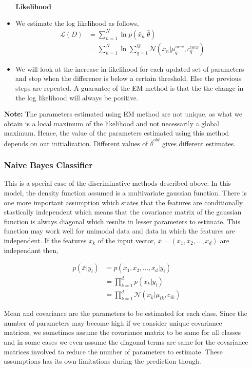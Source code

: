\begin{itemize}
      \item[\textbf{Likelihood}]  
      \item We estimate the log likelihood as follows,
            \begin{align*}
                \mathcal{L}(D)  &= \sum_{n=1}^{N} \ln{p(\bar{x}_n | \bar{\theta})} \\
                                &= \sum_{n=1}^{N} \ln{\sum_{q=1}^{Q}\mathcal{N}(\bar{x}_n|\bar{\mu}_{q}^{new},c_{q}^{new})}
            \end{align*}
     \item We will look at the increase in likelihood for each updated set of parameters and stop when the difference is below a certain threshold. Else the previous steps are repeated. A guarantee of the EM method is that the the change in the log likelihood will always be positive.
 \end{itemize}
 
 \textbf{Note:} The parameters estimated using EM method are not unique, as what we obtain is a local maximum of the likelihood and not necessarily a global maximum. Hence, the value of the parameters estimated using this method depends on our initialization. Different values of $\bar{\theta}^{old}$  gives different estimates.
 
 
 \subsubsection*{Naive Bayes Classifier}
  This is a special case of the discriminative methods described above. In this model, the density function assumed is a multivariate gaussian function. There is one more important assumption which states that the features are conditionally stastically independent which means that the covariance matrix of the gaussian function is always diagonal which results in lesser parameters to estimate. This function may work well for unimodal data and data in which the features are independent. If the features $x_k$ of the input vector, $\bar{x} = (x_1,x_2,\dots,x_d)$ are independant then,
  
  \begin{align*}
      p(\bar{x}|y_i) &= p(x_1,x_2,\dots,x_d | y_i) \\
                    &= \prod_{k=1}^{d} p(x_k|y_i) \\
                    &= \prod_{k=1}^{d} \mathcal{N}(x_k|\mu_{ik},c_{ik})
  \end{align*}
  
 Mean and covariance are the parameters to be estimated for each class. Since the number of parameters may become high if we consider unique covariance matrices, we sometimes assume the covariance matrix to be same for all classes and in some cases we even assume the diagonal terms are same for the covariance matrices involved to reduce the number of parameters to estimate. These assumptions has its own limitations during the prediction though.


